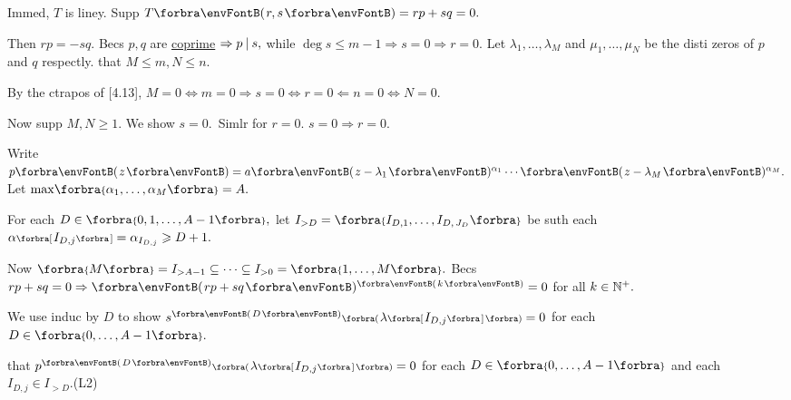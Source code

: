 Immed, $T$ is liney. \;Supp $T\Par{r,s}=rp+sq=0.$\par\quad
Then $rp=-sq.$ Becs $p,q$ are \uline{coprime} $\Rightarrow p\:\text{\normalsize|}\:s,$ while $\deg s\leqslant m-1\Rightarrow s=0\Rightarrow r=0.$\PfEnd\vspace{6pt}\quad
\Or Let $\lambda_1,\dots,\lambda_M$ and $\mu_1,\dots,\mu_N$ be the disti zeros of $p$ and $q$ respectly. \NOTICE that $M\leqslant m,N\leqslant n.$\vspace{2pt}\par\quad
By the ctrapos of [4.13], $M=0\Longleftrightarrow m=0\Rightarrow s=0\Longleftrightarrow r=0 \Leftarrow n=0\Longleftrightarrow N=0.$\vspace{2pt}\par\quad
Now supp $M,N\geqslant 1.$ We show $s=0.$ \,{\FontSmall Simlr for $r=0.$ \Or $s=0\Rightarrow r=0.$}\vspace{2pt}\par\quad
Write $p\Par{z}=a\Par{z-\lambda_1}{^{\alpha_1}}\cdots\Par{z-\lambda_M}{^{\alpha_M}}.$  Let $\max\!\Bra{\alpha_1,\dots,\alpha_M}=A.$\vspace{2pt}\par\quad
For each $D\in\Bra{0,1,\dots,A-1},$ let $I_{>D}=\Bra{{I_{D,1}},\dots,{I_{D,\,J_D}}}$ be suth each $\alpha\Sbra{I_{D,j}}=\alpha_{I_{D,j}}\geqslant D+1.$\vspace{2pt}\par\quad
Now $\Bra{M}=I_{>A-1}\subseteq \cdots\subseteq I_{>0}=\Bra{1,\dots,M}.$ Becs $rp+sq=0\Rightarrow\Par{rp+sq}{^{\SmallPar{k}}}=0$ for all $k\in{\mathbb{N}^+}.$\vspace{2pt}\par\quad
We use induc by $D$ to show $s{^{\SmallPar{D}}}\BigPar{\lambda\Sbra{I_{D,j}}}=0$ for each $D\in\Bra{0,\dots,A-1}.$\vspace{2pt}\par\quad
\NOTICE that $p{^{\SmallPar{D}}}\BigPar{\lambda\Sbra{I_{D,j}}}=0$ for each $D\in\Bra{0,\dots,A-1}$ and each $I_{D,j}\in I_{>D}.$\hfill(L2)\vspace{2pt}\par\quad

